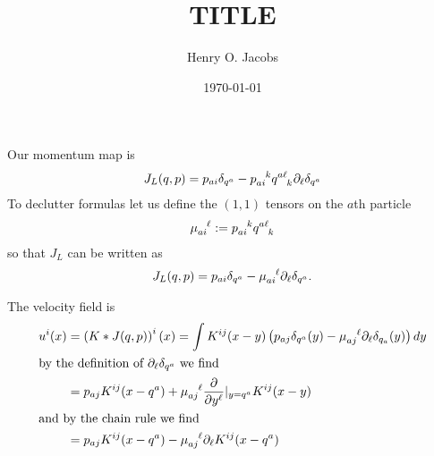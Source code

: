 \documentclass[12pt]{amsart}
\title{TITLE}
\author{Henry O. Jacobs}
\date{\today}
\newcommand{\pder}[2]{\ensuremath{\frac{ \partial #1}{\partial #2}}}
\begin{document}
\maketitle

Our momentum map is
\begin{align*}
  J_L(q,p) = p_{ai} \delta_{q^a} - p \indices{_{ai}^k} q\indices{^{a\ell}_k} \partial_\ell \delta_{q^a}
\end{align*}
To declutter formulas let us define the $(1,1)$ tensors on the $a$th particle
\begin{align*}
  \mu \indices{_{ai}^\ell} := p \indices{_{ai}^k} q\indices{^{a\ell}_k}
\end{align*}
so that $J_L$ can be written as
\begin{align*}
  J_L(q,p) = p_{ai} \delta_{q^a} -  \mu \indices{_{ai}^\ell} \partial_\ell \delta_{q^a}.
\end{align*}

The velocity field is
\begin{align*}
  u^i(x) &= \left( K* J(q,p) \right)^i(x) = \int K^{ij}(x-y)
  \left( p_{aj} \delta_{q^a}(y) - \mu \indices{_{aj}^\ell} \partial_\ell \delta_{q_a}(y) \right) dy \\
\intertext{by the definition of $\partial_{\ell}\delta_{q^a}$ we find}
  &= p_{aj} K^{ij}(x-q^a) + \mu\indices{_{aj}^\ell} \pder{}{y^\ell}|_{y = q^a} K^{ij}(x-y) \\
\intertext{and by the chain rule we find}
  &= p_{aj} K^{ij}(x-q^a) - \mu\indices{_{aj}^\ell} \partial_{\ell}K^{ij}(x-q^a)
\end{align*}
\end{document}
